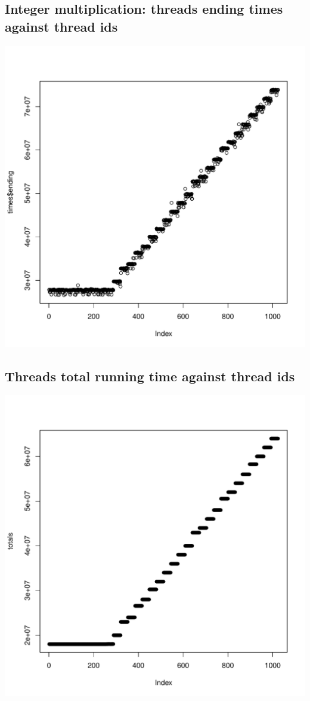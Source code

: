 \documentclass{article}
\begin{document}
	\subsection{Integer multiplication: threads ending times against thread ids}
	\includegraphics[width=\linewidth]{"ending_times"}
	\pagebreak

	\subsection{Threads total running time against thread ids}
	\includegraphics[width=\linewidth]{"running_times"}
	\pagebreak
\end{document}
